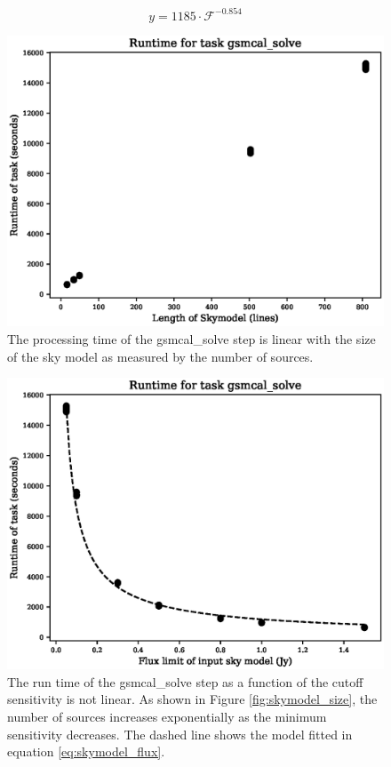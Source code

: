 \documentclass[preprint,5p]{elsarticle}
\begin{document}
\begin{equation}
    y=1185\cdot \mathcal{F}^{-0.854}
\label{eq:skymodel_flux}
\end{equation}

\begin{figure}
    \includegraphics[width=0.95\linewidth]{figures/skymodel_length.eps}
      \caption{The processing time of the gsmcal\_solve step is linear with the size of the sky model as measured by the number of sources.}
	\label{fig:skymodel_run_lenght}
\end{figure}

\begin{figure}
    \includegraphics[width=0.95\linewidth]{figures/skymodel_flux.eps}
      \caption{The run time of the gsmcal\_solve step as a function of the cutoff sensitivity is not linear. As shown in Figure \ref{fig:skymodel_size}, the number of sources increases exponentially as the minimum sensitivity decreases. The dashed line shows the model fitted in equation \ref{eq:skymodel_flux}. }
	\label{fig:skymodel_run_sens}
\end{figure}
\end{document}
